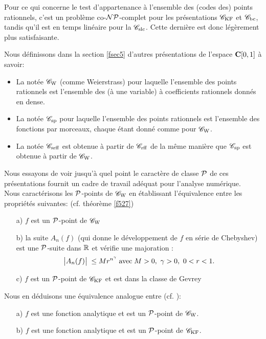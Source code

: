 Pour ce qui concerne le test d'appartenance à l'ensemble des (codes des) 
points rationnels,  c'est un problème co-${\cal NP}$-complet pour les 
présentations ${{{\mathscr C}}_{\rm KF}}$  et  ${{{\mathscr C}}_{\rm bc}}$, tandis qu'il est en temps linéaire pour la 
\pres  ${{{\mathscr C}}_{\rm slc}}$. Cette dernière est donc 
légèrement plus satisfaisante.

\medskip Nous définissons dans la section \ref{fsec5}  d'autres présentations 
de l'espace  ${{\bf C}[0,1]}$  à savoir:
\begin{itemize}
\item La \pres notée  ${{{\mathscr C}}_{\rm W}}$  (comme Weierstrass) pour laquelle l'ensemble des 
points rationnels est l'ensemble des \pols (à une variable) à 
coefficients rationnels donnés en \pres dense.
\item La \pres notée  ${{{\mathscr C}}_{\rm sp}}$  pour laquelle l'ensemble des points rationnels 
est l'ensemble des fonctions \polles par morceaux, chaque \pol 
étant donné comme pour  ${{{\mathscr C}}_{\rm W}}$.
\item La \pres notée  ${{{\mathscr C}}_{\rm srff}}$  est obtenue à partir de  ${{{\mathscr C}}_{\rm rff}}$  de la même 
manière que   ${{{\mathscr C}}_{\rm sp}}$    est obtenue à partir de  ${{{\mathscr C}}_{\rm W}}$.
\end{itemize}
Nous essayons de voir jusqu'à quel point le caractère de classe ${\cal P}$ de ces 
présentations fournit un cadre de travail adéquat pour l'analyse 
numérique.\\
Nous caractérisons les ${\cal P}$-points de  ${{{\mathscr C}}_{\rm W}}$ en établissant l'équivalence 
entre les propriétés suivantes: (cf. théorème \ref{f527})
\begin{itemize}
 \item[a)] $f$  est un ${\cal P}$-point de  ${{{\mathscr C}}_{\rm W}}$
\item[b)] la suite   $A_n(f)$ (qui donne le développement de  $f$  en série 
de Chebyshev) est une ${\cal P}$-suite dans  $\mathbb {R}$   et vérifie une majoration : 
\[
\big|{A_n(f)}\big|\;  \leq Mr^{n^{\gamma}} \;\hbox{avec}\;M > 0,~\gamma > 0,~0< r < 1.
\]


\item[c)] $f$ est un ${\cal P}$-point de  ${{{\mathscr C}}_{\rm KF}}$  et est dans la classe de Gevrey 
\end{itemize}
Nous en déduisons une équivalence analogue entre (cf. ):
\begin{itemize}
\item[a)] $f$ est une fonction analytique et est un ${\cal P}$-point de  ${{{\mathscr C}}_{\rm W}}$.
\item[b)] $f$ est une fonction analytique et est un ${\cal P}$-point de  ${{{\mathscr C}}_{\rm KF}}$.
\end{itemize}


